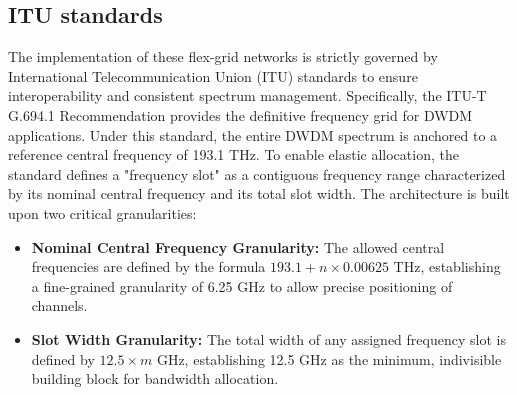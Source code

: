 \subsection{ITU standards}
The implementation of these flex-grid networks is strictly governed by International Telecommunication Union (ITU) standards to ensure interoperability and consistent spectrum management. Specifically, the ITU-T G.694.1 Recommendation provides the definitive frequency grid for DWDM applications. Under this standard, the entire DWDM spectrum is anchored to a reference central frequency of 193.1 THz.
To enable elastic allocation, the standard defines a "frequency slot" as a contiguous frequency range characterized by its nominal central frequency and its total slot width. The architecture is built upon two critical granularities:
\begin{itemize}
    \item \textbf{Nominal Central Frequency Granularity:} The allowed central frequencies are defined by the formula $193.1 + n \times 0.00625$ THz, establishing a fine-grained granularity of 6.25 GHz to allow precise positioning of channels.
    \item \textbf{Slot Width Granularity:} The total width of any assigned frequency slot is defined by $12.5 \times m$ GHz, establishing 12.5 GHz as the minimum, indivisible building block for bandwidth allocation.
\end{itemize}
